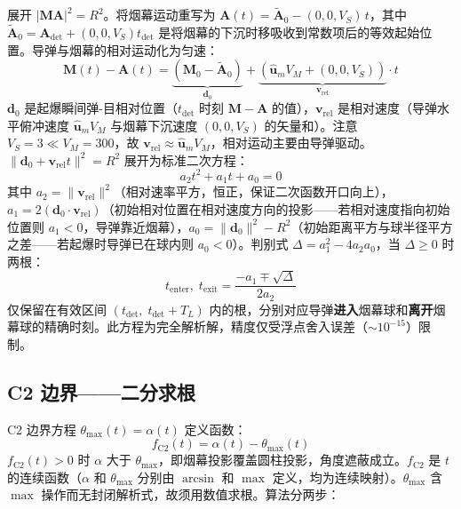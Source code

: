 \documentclass[12pt,a4paper]{ctexart}
\newcommand{\tdet}{t_{\text{det}}}
\newcommand{\MA}{|\mathbf{M}\mathbf{A}|}
\begin{document}
展开 $\MA^2 = R^2$。将烟幕运动重写为 $\mathbf{A}(t) = \tilde{\mathbf{A}}_0 - (0,0,V_S)\,t$，其中 $\tilde{\mathbf{A}}_0 = \mathbf{A}_{\text{det}} + (0,0,V_S)\tdet$ 是将烟幕的下沉时移吸收到常数项后的等效起始位置。导弹与烟幕的相对运动化为匀速：
\begin{equation}
\mathbf{M}(t) - \mathbf{A}(t) = \underbrace{(\mathbf{M}_0 - \tilde{\mathbf{A}}_0)}_{\mathbf{d}_0} + \underbrace{(\hat{\mathbf{u}}_m V_M + (0,0,V_S))}_{\mathbf{v}_{\text{rel}}} \cdot t
\end{equation}
$\mathbf{d}_0$ 是起爆瞬间弹-目相对位置（$\tdet$ 时刻 $\mathbf{M} - \mathbf{A}$ 的值），$\mathbf{v}_{\text{rel}}$ 是相对速度（导弹水平俯冲速度 $\hat{\mathbf{u}}_m V_M$ 与烟幕下沉速度 $(0,0,V_S)$ 的矢量和）。注意 $V_S = 3 \ll V_M = 300$，故 $\mathbf{v}_{\text{rel}} \approx \hat{\mathbf{u}}_m V_M$，相对运动主要由导弹驱动。$\|\mathbf{d}_0 + \mathbf{v}_{\text{rel}} t\|^2 = R^2$ 展开为标准二次方程：
\begin{equation}
\boxed{a_2 t^2 + a_1 t + a_0 = 0}
\end{equation}
其中 $a_2 = \|\mathbf{v}_{\text{rel}}\|^2$（相对速率平方，恒正，保证二次函数开口向上），$a_1 = 2(\mathbf{d}_0 \cdot \mathbf{v}_{\text{rel}})$（初始相对位置在相对速度方向的投影——若相对速度指向初始位置则 $a_1 < 0$，导弹靠近烟幕），$a_0 = \|\mathbf{d}_0\|^2 - R^2$（初始距离平方与球半径平方之差——若起爆时导弹已在球内则 $a_0 < 0$）。判别式 $\Delta = a_1^2 - 4a_2a_0$，当 $\Delta \geq 0$ 时两根：
\begin{equation}
t_{\text{enter}},\; t_{\text{exit}} = \frac{-a_1 \mp \sqrt{\Delta}}{2a_2}
\end{equation}
仅保留在有效区间 $(\tdet,\; \tdet + T_L)$ 内的根，分别对应导弹\textbf{进入}烟幕球和\textbf{离开}烟幕球的精确时刻。此方程为完全解析解，精度仅受浮点舍入误差（$\sim 10^{-15}$）限制。

\subsection{C2 边界——二分求根}

C2 边界方程 $\theta_{\max}(t) = \alpha(t)$ 定义函数：
\begin{equation}
\boxed{f_{\text{C2}}(t) = \alpha(t) - \theta_{\max}(t)}
\end{equation}
$f_{\text{C2}}(t) > 0$ 时 $\alpha$ 大于 $\theta_{\max}$，即烟幕投影覆盖圆柱投影，角度遮蔽成立。$f_{\text{C2}}$ 是 $t$ 的连续函数（$\alpha$ 和 $\theta_{\max}$ 分别由 $\arcsin$ 和 $\max$ 定义，均为连续映射）。$\theta_{\max}$ 含 $\max$ 操作而无封闭解析式，故须用数值求根。算法分两步：
\end{document}
